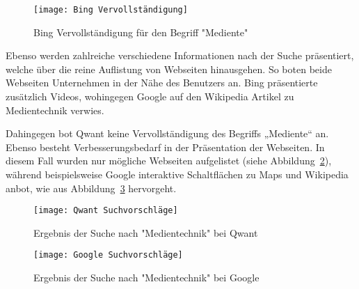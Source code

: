 \begin{figure}[h]
    \centering
    \texttt{[image: Bing Vervollständigung]}
    \caption{Bing Vervollständigung für den Begriff "Mediente"}
    \label{fig:bingvervollstandigung}
\end{figure}

Ebenso werden zahlreiche verschiedene Informationen nach der Suche präsentiert, welche über die reine Auflistung von Webseiten
hinausgehen. So boten beide Webseiten Unternehmen in der Nähe des Benutzers an. Bing präsentierte zusätzlich Videos, wohingegen
Google auf den Wikipedia Artikel zu Medientechnik verwies.

Dahingegen bot Qwant keine Vervollständigung des Begriffs „Mediente“ an. Ebenso besteht Verbesserungsbedarf in der Präsentation
der Webseiten. In diesem Fall wurden nur mögliche Webseiten aufgelistet (siehe Abbildung~\ref{fig:qwantvorschlage}), während beispielsweise Google
interaktive Schaltflächen zu Maps und Wikipedia anbot, wie aus Abbildung~\ref{fig:googlevorschlage} hervorgeht.
\begin{figure}[h]
    \centering
    \texttt{[image: Qwant Suchvorschläge]}
    \caption{Ergebnis der Suche nach "Medientechnik" bei Qwant}
    \label{fig:qwantvorschlage}
\end{figure}

\begin{figure}[h]
    \centering
    \texttt{[image: Google Suchvorschläge]}
    \caption{Ergebnis der Suche nach "Medientechnik" bei Google}
    \label{fig:googlevorschlage}
\end{figure}